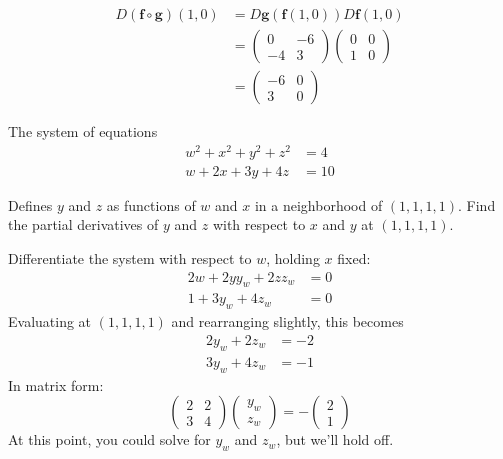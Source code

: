 \documentclass[answers]{exam}
\newcommand{\vf}{\mathbf{f}}
\newcommand{\vg}{\mathbf{g}}
\begin{document}
\begin{questions}
\begin{solution}
        \begin{align*}
            D(\vf\circ\vg)(1,0) &= D\vg(\vf(1,0))D\vf(1,0)\\
            &=\begin{pmatrix}
                0&-6\\-4&3
            \end{pmatrix}\begin{pmatrix}
                0&0\\1&0
            \end{pmatrix}\\
            &= \begin{pmatrix}
                -6&0\\3&0
            \end{pmatrix}
        \end{align*}
    \end{solution}

    \question
    The system of equations
    \begin{align*}
        w^2 + x^2 + y^2 + z^2 &= 4\\
        w + 2x + 3y + 4z &= 10
    \end{align*}

    Defines $y$ and $z$ as functions of $w$ and $x$ in a neighborhood of $(1,1,1,1)$.
    Find the partial derivatives of $y$ and $z$ with respect to $x$ and $y$ at $(1,1,1,1)$.

    \begin{solution}
        Differentiate the system with respect to $w$, holding $x$ fixed:
        \begin{align*}
            2w + 2yy_w + 2zz_w &= 0\\
            1 + 3y_w + 4z_w &= 0
        \end{align*}
        Evaluating at $(1,1,1,1)$ and rearranging slightly, this becomes
        \begin{align*}
            2y_w + 2z_w &= -2\\
            3y_w + 4z_w &= -1
        \end{align*}
        In matrix form:
        \[
            \begin{pmatrix}
                2&2\\3&4
            \end{pmatrix}\begin{pmatrix}
                y_w\\z_w
            \end{pmatrix}= -\begin{pmatrix}
                2\\1
            \end{pmatrix}\tag{\dag}
        \]
        At this point, you could solve for $y_w$ and $z_w$, but we'll hold off.


\end{solution}
\end{questions}
\end{document}
